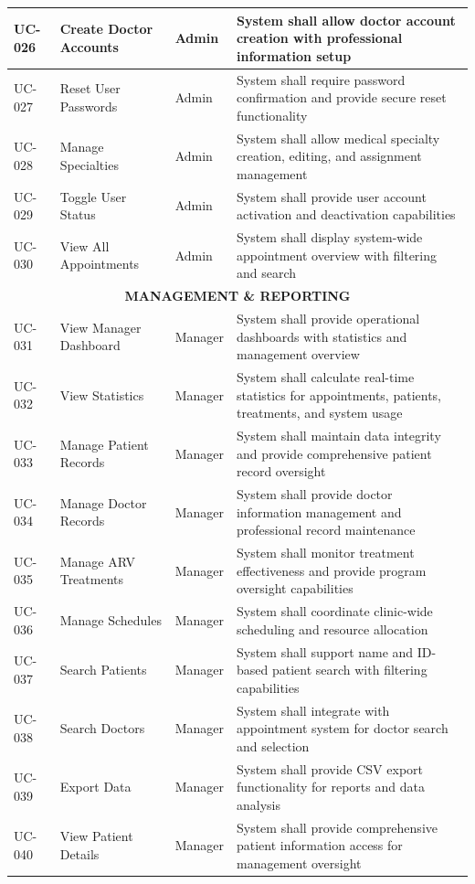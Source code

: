 \documentclass[12pt,a4paper]{article}
\begin{document}
\begin{longtable}{|p{1.2cm}|p{2.5cm}|p{3.5cm}|p{6.8cm}|}
\hline
UC-026 & Create Doctor Accounts & Admin & System shall allow doctor account creation with professional information setup \\
\hline
UC-027 & Reset User Passwords & Admin & System shall require password confirmation and provide secure reset functionality \\
\hline
UC-028 & Manage Specialties & Admin & System shall allow medical specialty creation, editing, and assignment management \\
\hline
UC-029 & Toggle User Status & Admin & System shall provide user account activation and deactivation capabilities \\
\hline
UC-030 & View All Appointments & Admin & System shall display system-wide appointment overview with filtering and search \\
\hline
\multicolumn{4}{|c|}{\textbf{MANAGEMENT \& REPORTING}} \\
\hline
UC-031 & View Manager Dashboard & Manager & System shall provide operational dashboards with statistics and management overview \\
\hline
UC-032 & View Statistics & Manager & System shall calculate real-time statistics for appointments, patients, treatments, and system usage \\
\hline
UC-033 & Manage Patient Records & Manager & System shall maintain data integrity and provide comprehensive patient record oversight \\
\hline
UC-034 & Manage Doctor Records & Manager & System shall provide doctor information management and professional record maintenance \\
\hline
UC-035 & Manage ARV Treatments & Manager & System shall monitor treatment effectiveness and provide program oversight capabilities \\
\hline
UC-036 & Manage Schedules & Manager & System shall coordinate clinic-wide scheduling and resource allocation \\
\hline
UC-037 & Search Patients & Manager & System shall support name and ID-based patient search with filtering capabilities \\
\hline
UC-038 & Search Doctors & Manager & System shall integrate with appointment system for doctor search and selection \\
\hline
UC-039 & Export Data & Manager & System shall provide CSV export functionality for reports and data analysis \\
\hline
UC-040 & View Patient Details & Manager & System shall provide comprehensive patient information access for management oversight \\

\end{longtable}
\end{document}

